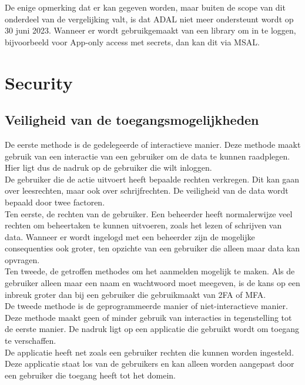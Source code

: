 De enige opmerking dat er kan gegeven worden, maar buiten de scope van dit onderdeel van de vergelijking valt, is dat \ac{ADAL} niet meer ondersteunt wordt op 30 juni 2023. Wanneer er wordt gebruikgemaakt van een library om in te loggen, bijvoorbeeld voor App-only access met secrets, dan kan dit via \ac{MSAL}.



\section{Security}

\subsection{Veiligheid van de toegangsmogelijkheden}

De eerste methode is de gedelegeerde of interactieve manier. Deze methode maakt gebruik van een interactie van een gebruiker om de data te kunnen raadplegen. Hier ligt dus de nadruk op de gebruiker die wilt inloggen. \\

De gebruiker die de actie uitvoert heeft bepaalde rechten verkregen. Dit kan gaan over leesrechten, maar ook over schrijfrechten. De veiligheid van de data wordt bepaald door twee factoren. \\

Ten eerste, de rechten van de gebruiker. Een beheerder heeft normalerwijze veel rechten om beheertaken te kunnen uitvoeren, zoals het lezen of schrijven van data. Wanneer er wordt ingelogd met een beheerder zijn de mogelijke consequenties ook groter, ten opzichte van een gebruiker die alleen maar data kan opvragen. \\ 

Ten tweede, de getroffen methodes om het aanmelden mogelijk te maken. Als de gebruiker alleen maar een naam en wachtwoord moet meegeven, is de kans op een inbreuk groter dan bij een gebruiker die gebruikmaakt van \ac{2FA} of \Ac{MFA}. \\

De tweede methode is de geprogrammeerde manier of niet-interactieve manier. Deze methode maakt geen of minder gebruik van interacties in tegenstelling tot de eerste manier. De nadruk ligt op een applicatie die gebruikt wordt om toegang te verschaffen. \\

De applicatie heeft net zoals een gebruiker rechten die kunnen worden ingesteld. Deze applicatie staat los van de gebruikers en kan alleen worden aangepast door een gebruiker die toegang heeft tot het domein. \\

